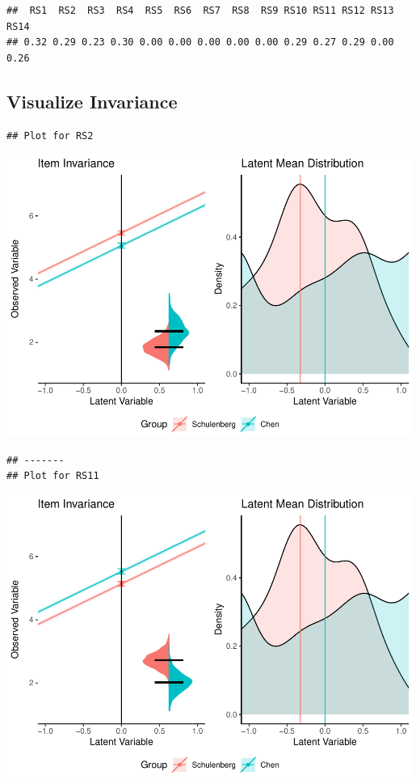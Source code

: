 \documentclass[
  man]{apa7}
\begin{document}
\begin{verbatim}
##  RS1  RS2  RS3  RS4  RS5  RS6  RS7  RS8  RS9 RS10 RS11 RS12 RS13 RS14 
## 0.32 0.29 0.23 0.30 0.00 0.00 0.00 0.00 0.00 0.29 0.27 0.29 0.00 0.26
\end{verbatim}

\hypertarget{visualize-invariance}{%
\subsection{Visualize Invariance}\label{visualize-invariance}}

\begin{verbatim}
## Plot for RS2
\end{verbatim}

\includegraphics{manuscript_files/figure-latex/unnamed-chunk-103-1.pdf}

\begin{verbatim}
## -------
## Plot for RS11
\end{verbatim}

\includegraphics{manuscript_files/figure-latex/unnamed-chunk-103-2.pdf}
\end{document}
